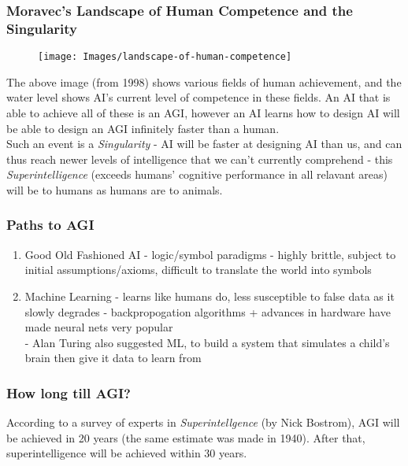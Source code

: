\subsubsection{Moravec's Landscape of Human Competence and the Singularity}
\begin{figure}[H]
    \centering
    \texttt{[image: Images/landscape-of-human-competence]}
\end{figure}
The above image (from 1998) shows various fields of human achievement, and the water level shows AI's current level of competence in these fields. An AI that is able to achieve all of these is an AGI, however an AI learns how to design AI will be able to design an AGI infinitely faster than a human.\\

Such an event is a \emph{Singularity} - AI will be faster at designing AI than us, and can thus reach newer levels of intelligence that we can't currently comprehend - this \emph{Superintelligence} (exceeds humans' cognitive performance in all relavant areas) will be to humans as humans are to animals. 

\subsubsection{Paths to AGI}
\begin{enumerate}
    \item Good Old Fashioned AI - logic/symbol paradigms - highly brittle, subject to initial assumptions/axioms, difficult to translate the world into symbols
    \item Machine Learning - learns like humans do, less susceptible to false data as it slowly degrades - backpropogation algorithms + advances in hardware have made neural nets very popular \\ \quad \quad - Alan Turing also suggested ML, to build a system that simulates a child's brain then give it data to learn from
\end{enumerate}

\subsubsection{How long till AGI?}
According to a survey of experts in \emph{Superintellgence} (by Nick Bostrom), AGI will be achieved in 20 years (the same estimate was made in 1940). After that, superintelligence will be achieved within 30 years.\\

